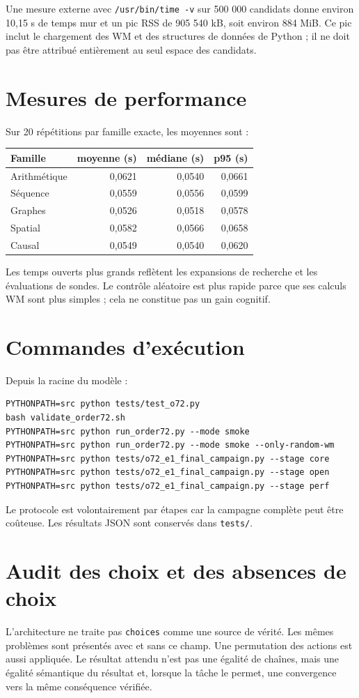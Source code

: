 \documentclass[11pt,a4paper]{article}
\begin{document}
Une mesure externe avec \texttt{/usr/bin/time -v} sur 500 000 candidats donne environ 10,15 s de temps mur et un pic RSS de 905 540 kB, soit environ 884 MiB. Ce pic inclut le chargement des WM et des structures de données de Python ; il ne doit pas être attribué entièrement au seul espace des candidats.
\section{Mesures de performance}
Sur 20 répétitions par famille exacte, les moyennes sont :
\begin{longtable}{p{}rrr}
\toprule
Famille & moyenne (s) & médiane (s) & p95 (s) \\
\midrule
Arithmétique & 0,0621 & 0,0540 & 0,0661 \\
Séquence & 0,0559 & 0,0556 & 0,0599 \\
Graphes & 0,0526 & 0,0518 & 0,0578 \\
Spatial & 0,0582 & 0,0566 & 0,0658 \\
Causal & 0,0549 & 0,0540 & 0,0620 \\
\bottomrule
\end{longtable}

Les temps ouverts plus grands reflètent les expansions de recherche et les évaluations de sondes. Le contrôle aléatoire est plus rapide parce que ses calculs WM sont plus simples ; cela ne constitue pas un gain cognitif.
\section{Commandes d'exécution}
Depuis la racine du modèle :
\begin{verbatim}
PYTHONPATH=src python tests/test_o72.py
bash validate_order72.sh
PYTHONPATH=src python run_order72.py --mode smoke
PYTHONPATH=src python run_order72.py --mode smoke --only-random-wm
PYTHONPATH=src python tests/o72_e1_final_campaign.py --stage core
PYTHONPATH=src python tests/o72_e1_final_campaign.py --stage open
PYTHONPATH=src python tests/o72_e1_final_campaign.py --stage perf
\end{verbatim}
Le protocole est volontairement par étapes car la campagne complète peut être coûteuse. Les résultats JSON sont conservés dans \texttt{tests/}.
\section{Audit des choix et des absences de choix}
L'architecture ne traite pas \texttt{choices} comme une source de vérité. Les mêmes problèmes sont présentés avec et sans ce champ. Une permutation des actions est aussi appliquée. Le résultat attendu n'est pas une égalité de chaînes, mais une égalité sémantique du résultat et, lorsque la tâche le permet, une convergence vers la même conséquence vérifiée.
\end{document}
